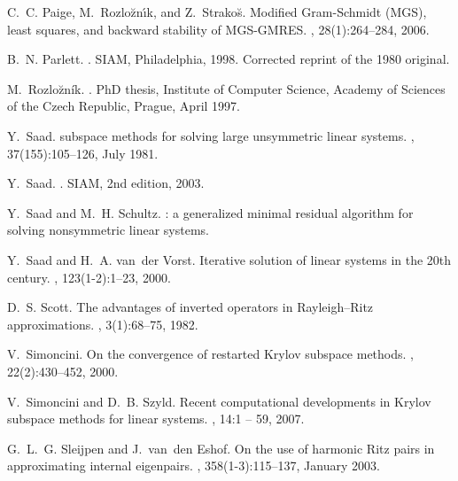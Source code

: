 \begin{thebibliography}{100}
 C.~C. Paige, M.~Rozlo{\u{z}}n{\'{\i}}k, and Z.~Strako{\u{s}}. \newblock
  Modified {G}ram-{S}chmidt ({MGS}), least squares, and backward
stability of {MGS-GMRES}.
,
28(1):264--284, 2006.


	
	 B.~N. Parlett. . \newblock SIAM,
	Philadelphia, 1998. \newblock Corrected reprint of the 1980 original.

 M.~Rozlo\u{z}ník. .
    \newblock PhD thesis, Institute of Computer Science, Academy of Sciences of the
  Czech Republic, Prague, April 1997.


 Y.~Saad.  subspace methods for solving large unsymmetric linear
  systems.
, 37(155):105--126, July 1981.

	 Y.~Saad. . \newblock SIAM,
	2nd edition, 2003.
	
	 Y.~Saad and M.~H. Schultz. : a generalized minimal residual
    algorithm for solving
  nonsymmetric linear systems.

   Y.~Saad and H.~A. van~der Vorst. \newblock Iterative solution of linear systems in
    the 20th century. ,
  123(1-2):1--23, 2000.



	
	 D.~S. Scott. \newblock The advantages of inverted operators in {Rayleigh--Ritz}
	approximations.
	,
	3(1):68--75, 1982.
		
	 V.~Simoncini. \newblock On the convergence of restarted {Krylov} subspace
    methods. ,
  22(2):430--452, 2000.

 
     V.~Simoncini and D.~B. Szyld. \newblock Recent computational developments in
    {Krylov} subspace methods for
  linear systems.
, 14:1 -- 59, 2007.

		
	 G.~L.~G. Sleijpen and J.~van~den Eshof. \newblock On the use of harmonic {Ritz}
	pairs in approximating internal
	eigenpairs.
	, 358(1-3):115--137, January
	2003.
	

\end{thebibliography}
